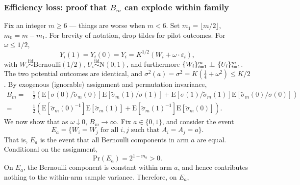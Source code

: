 \documentclass[aspectratio=169, 10pt]{beamer}
\theoremstyle{definition}
\theoremstyle{plain}
\newcommand{\indep}{\mathrel{\perp\mspace{-11mu}\perp}}
\def\Pr{\mathrm{Pr}}
\def\E{\mathrm{E}}
\def\Normal{\mathrm{N}} %
\def\Bern{\mathrm{Bernoulli}} %
\def\iid{\mathrm{iid}}
\begin{document}
\begin{frame}
\frametitle{Efficiency loss: proof that \(B_{m}\) can explode within family
\hyperlink{itm--efficiency-loss-proof-sketch}{%
  }}
\label{frm--prf--Bm-explodes-existence}
Fix an integer \(m \geq 6\) --- things are worse when \(m < 6\).
Set \(m_{1} = \lfloor m / 2 \rfloor\), \(m_{0} = m - m_{1}\).
For brevity of notation, drop tildes for pilot outcomes.
For \(\omega \leq 1/2\),
\begin{equation*}
  Y_{i} (1) = Y_{i} (0) = Y_{i} = K^{1/2} (W_{i} + \omega \cdot
  \varepsilon_{i}),
\end{equation*}
with \(W_{i} \overset{\iid}{\sim} \Bern (1/2)\), \(U_{i} \overset{\iid}{\sim}
\Normal (0, 1)\), and furthermore \(\{W_{i}\}_{i = 1}^{m} \indep
\{U_{i}\}_{i=1}^{m}\).
The two potential outcomes are identical, and \(\sigma^{2} (a) = \sigma^{2} =
K (\frac{1}{4} + \omega^{2}) \leq K / 2\).
By exogenous (ignorable) assignment and permutation invariance,
\begin{equation*}
  \begin{split}
    B_{m} =
    & \, \frac{1}{2} \left( \E \left[ \sigma (0) / \tilde{\sigma}_{m} (0)
    \right] \E \left[ \tilde{\sigma}_{m} (1) / \sigma (1) \right] +
    \E \left[ \sigma (1) / \tilde{\sigma}_{m} (1) \right] \E \left[
    \tilde{\sigma}_{m} (0) / \sigma (0) \right] \right) \\
    =
    & \, \frac{1}{2} \left( \E \left[ \tilde{\sigma}_{m} (0)^{-1} \right] \E
    \left[ \tilde{\sigma}_{m} (1) \right] + \E \left[ \tilde{\sigma}_{m}
    (1)^{-1} \right] \E \left[ \tilde{\sigma}_{m} (0) \right] \right).
  \end{split}
\end{equation*}
We now show that as \(\omega \downarrow 0\), \(B_{m} \to \infty\).
Fix \(a \in \{0, 1\}\), and consider the event
\begin{equation*}
  E_{a} = \{W_{i} = W_{j} \text{ for all } i, j \text{ such that } A_{i} = A_{j}
  = a\}.
\end{equation*}
That is, \(E_{a}\) is the event that all Bernoulli components in arm \(a\) are
equal.
Conditional on the assignment,
\begin{equation*}
  \Pr (E_{a}) = 2^{1 - m_{a}} > 0.
\end{equation*}
On \(E_{a}\), the Bernoulli component is constant within arm \(a\), and hence
contributes nothing to the within-arm sample variance.
Therefore, on \(E_{a}\),

\end{frame}
\end{document}
